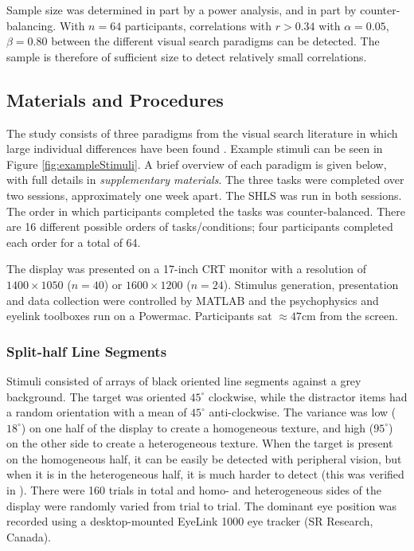 \documentclass[a4paper, man, natbib, floatsintext]{apa6}
\begin{document}
Sample size was determined in part by a power analysis, and in part by counter-balancing. With $n = 64$ participants, correlations with $r > 0.34$ with $\alpha = 0.05$, $\beta = 0.80$ between the different visual search paradigms can be detected. The sample is therefore of sufficient size to detect relatively small correlations.

\subsection{Materials and Procedures}

The study consists of three paradigms from the visual search literature in which large individual differences have been  found \citep{nowakowska2017, irons-leber2016, kristjansson2014}. Example stimuli can be seen in Figure \ref{fig:exampleStimuli}. A brief overview of each paradigm is given below, with full details in \textit{supplementary materials}. The three tasks were completed over two sessions, approximately one week apart. The SHLS was run in both sessions. The order in which participants completed the tasks was counter-balanced. There are 16 different possible orders of tasks/conditions; four participants completed each order for a total of 64.

The display was presented on a 17-inch CRT monitor with a resolution of $1400 \times 1050$ ($n = 40$) or $1600 \times 1200$ ($n = 24$). Stimulus generation, presentation and data collection were controlled by MATLAB and the psychophysics and eyelink toolboxes  \citep{brainard1997,cornelissen2002} run on a Powermac. Participants sat $\approx 47$cm from the screen.

\subsubsection{Split-half Line Segments}

Stimuli consisted of arrays of black oriented line segments against a grey background. The target was oriented $45^{\circ}$ clockwise, while the distractor items had a random orientation with a mean of $45^{\circ}$ anti-clockwise. The variance was low ($18^{\circ}$) on one half of the display to create a homogeneous texture, and high ($95^{\circ}$) on the other side to create a heterogeneous texture. When the target is present on the homogeneous half, it can be easily be detected with peripheral vision, but when it is in the heterogeneous half, it is much harder to detect (this was verified in \cite{nowakowska2017}). There were 160 trials in total and homo- and heterogeneous sides of the display were randomly varied from trial to trial. The dominant eye position was recorded using a desktop-mounted EyeLink 1000 eye tracker (SR Research, Canada). 
\end{document}
